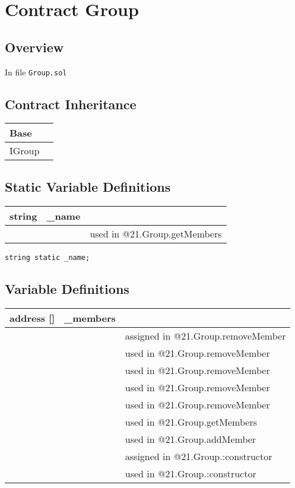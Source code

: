 
\chapter{Contract Group}

\minitoc

\section{Overview}


In file {\tt Group.sol}

\section{Contract Inheritance}


\noindent\begin{tabular}{|l|p{5cm}|}\hline
Base & \\\hline
IGroup & \\\hline
\end{tabular}


\section{Static Variable Definitions}


\ifsoltables
\noindent\begin{tabular}{|l|l|p{5cm}|}\hline
string & \_{}name &  \\\hline
 & & used in @21.Group.getMembers\\\hline
\end{tabular}
\fi


\begin{lstlisting}[firstnumber=11]
    string static _name;
\end{lstlisting}

\section{Variable Definitions}


\ifsoltables
\noindent\begin{tabular}{|l|l|p{5cm}|}\hline
address [] & \_{}members &  \\\hline
 & & assigned in @21.Group.removeMember\\\hline
 & & used in @21.Group.removeMember\\\hline
 & & used in @21.Group.removeMember\\\hline
 & & used in @21.Group.removeMember\\\hline
 & & used in @21.Group.removeMember\\\hline
 & & used in @21.Group.getMembers\\\hline
 & & used in @21.Group.addMember\\\hline
 & & assigned in @21.Group.:constructor\\\hline
 & & used in @21.Group.:constructor\\\hline
\end{tabular}
\fi


